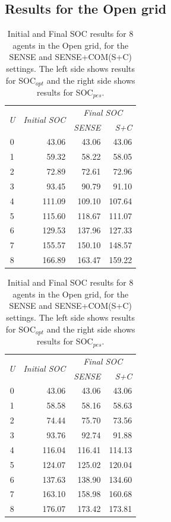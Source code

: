 \documentclass[jair,twoside,11pt,theapa]{article}
\newcommand{\sense}{SENSE\xspace}
\newcommand{\sensecom}{SENSE+COM\xspace}
\newcommand{\socopt}{SOC$_{opt}$\xspace}
\newcommand{\socpes}{SOC$_{pes}$\xspace}
\begin{document}
\subsection{Results for the Open grid}
\begin{table}
\parbox{.5\linewidth}{
\centering
\begin{tabular}{crrr}
\hline
\multirow{2}{*}{\textit{U}} & \multirow{2}{*}{\textit{Initial SOC}} & \multicolumn{2}{c}{\textit{Final SOC}} \\ \cline{3-4} 
 &  & \textit{\sense} & \textit{S+C} \\ \hline
0 & 43.06 & 43.06 & 43.06 \\
1 & 59.32 & 58.22 & 58.05 \\
2 & 72.89 & 72.61 & 72.96 \\
3 & 93.45 & 90.79 & 91.10 \\
4 & 111.09 & 109.10 & 107.64 \\
5 & 115.60 & 118.67 & 111.07 \\
6 & 129.53 & 137.96 & 127.33 \\
7 & 155.57 & 150.10 & 148.57 \\
8 & 166.89 & 163.47 & 159.22 \\ \hline
\end{tabular}
}
\hfill
\parbox{.5\linewidth}{
\centering
\begin{tabular}{crrr}
\hline
\multirow{2}{*}{\textit{U}} & \multirow{2}{*}{\textit{Initial SOC}} & \multicolumn{2}{c}{\textit{Final SOC}} \\ \cline{3-4} 
 &  & \multicolumn{1}{r}{\textit{\sense}} & \multicolumn{1}{r}{\textit{S+C}} \\ \hline
0 & 43.06 & 43.06 & 43.06 \\
1 & 58.58 & 58.16 & 58.63 \\
2 & 74.44 & 75.70 & 73.56 \\
3 & 93.76 & 92.74 & 91.88 \\
4 & 116.04 & 116.41 & 114.13 \\
5 & 124.07 & 125.02 & 120.04 \\
6 & 137.63 & 138.90 & 134.60 \\
7 & 163.10 & 158.98 & 160.68 \\
8 & 176.07 & 173.42 & 173.81 \\ \hline
\end{tabular}
}
\caption{Initial and Final SOC results for 8 agents in the Open grid, for the \sense and \sensecom (S+C) settings. 
The left side shows results for \socopt and the right side shows results for \socpes.}
\label{tab:open_map-absolute-online}
\end{table}
\end{document}
